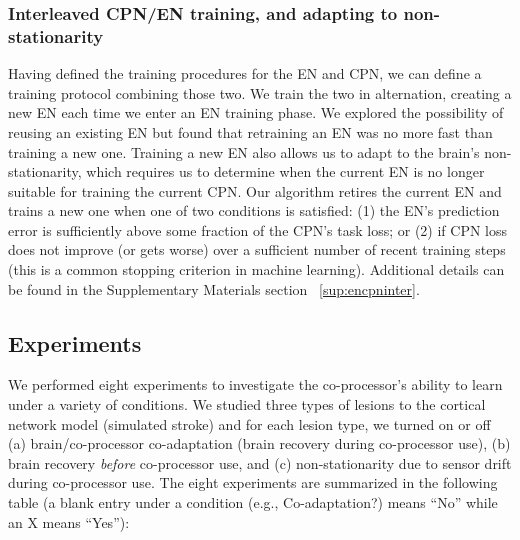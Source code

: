 \documentclass[12pt]{iopart}
\begin{document}
\subsubsection{Interleaved CPN/EN training, and adapting to non-stationarity}
\label{sec:interleaving}
Having defined the training procedures for the EN and CPN, we can define a training
protocol combining those two. We train the two in alternation, creating
a new EN each time we enter an EN training phase. We explored the possibility
of reusing an existing EN but found that retraining an EN was no more fast than training a new one.
Training a new EN also allows us to adapt to the brain's non-stationarity, which requires us to
determine when the current EN is no longer suitable for training the current CPN. 
Our algorithm retires the current EN and trains a new one when one of two conditions
is satisfied: (1) the EN's prediction error is sufficiently above some fraction of the CPN's task loss;
or (2) if CPN loss does not improve (or gets worse) over a sufficient number of recent training steps 
(this is a common stopping criterion in machine learning). Additional details can be found in the
Supplementary Materials section ~\ref{sup:encpninter}.

\subsection{Experiments}
\label{sec:experiments}

We performed eight experiments to investigate the co-processor's ability to learn under a variety of
conditions. We studied three types of lesions to the cortical network model (simulated stroke) and for
each lesion type, we turned on or off (a) brain/co-processor co-adaptation (brain recovery during
co-processor use), (b) brain recovery {\em before} co-processor use, and (c) non-stationarity due to
sensor drift during co-processor use. The eight experiments are summarized in the following table 
(a blank entry under a condition (e.g., Co-adaptation?) means ``No'' while an X means ``Yes''): \\
\end{document}

